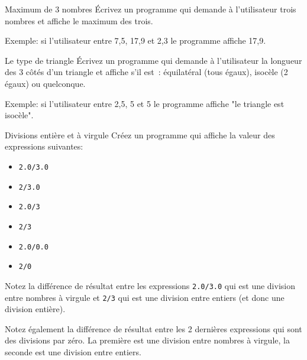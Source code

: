 \documentclass[a4paper,11pt]{article}
\begin{document}
	\begin{Exercice}{Maximum de 3 nombres}
		\'Ecrivez un programme qui demande à l'utilisateur 
		trois nombres  et affiche le maximum des trois.
		
		Exemple: si l'utilisateur entre 7,5, 17,9 et 2,3 le programme affiche 17,9. 
	\end{Exercice}

	\begin{Exercice}{Le type de triangle}
 		\'Ecrivez un programme qui demande à l'utilisateur 
		 la longueur des 3 côtés d'un triangle et affiche s'il est~: 
		 équilatéral (tous égaux), isocèle (2 égaux) ou quelconque.
		 
		 Exemple: si l'utilisateur entre 2,5, 5 et 5 le programme affiche "le triangle est isocèle". 
	\end{Exercice}
	
	\begin{Exercice}{Divisions entière et à virgule}
		Créez un programme qui affiche la valeur des expressions suivantes:
	
		\begin{itemize}		
			\item \texttt{2.0/3.0}
			\item \texttt{2/3.0}
			\item \texttt{2.0/3}
			\item \texttt{2/3}
			\item \texttt{2.0/0.0}
			\item \texttt{2/0}
		\end{itemize}
	
		Notez la différence de résultat entre les expressions \texttt{2.0/3.0} qui est une division entre nombres à virgule 
		et \texttt{2/3} qui est une division entre entiers (et donc une division entière).
	
		Notez également la différence de résultat entre les 2 dernières expressions qui sont des divisions par zéro.
		La première est une division entre nombres à virgule,
		la seconde est une division entre entiers.
	\end{Exercice}
	
\end{document}
